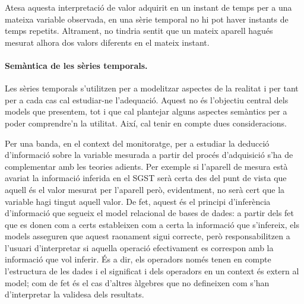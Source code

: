 Atesa aquesta interpretació de valor adquirit en un instant de
temps per a una mateixa variable observada, en una sèrie temporal no
hi pot haver instants de temps repetits. Altrament, no tindria sentit
que un mateix aparell hagués mesurat alhora dos valors diferents en el
mateix instant.
  






\paragraph{Semàntica de les sèries temporals.}
Les sèries temporals s'utilitzen per a modelitzar aspectes de la
realitat i per tant per a cada cas cal estudiar-ne l'adequació. Aquest
no és l'objectiu central dels models que presentem, tot i que cal
plantejar alguns aspectes semàntics per a poder comprendre'n la
utilitat. Així, cal tenir en compte dues consideracions.


Per una banda, en el context del monitoratge, per a estudiar la
deducció d'informació sobre la variable mesurada a partir del procés
d'adquisició s'ha de complementar amb les teories adients.  Per
exemple si l'aparell de mesura està avariat la informació inferida en
el \gls{SGST} serà certa des del punt de vista que aquell és el valor
mesurat per l'aparell però, evidentment, no serà cert que la variable
hagi tingut aquell valor. De fet, aquest és el principi d'inferència
d'informació que segueix el model relacional de bases de dades: a
partir dels fet que es donen com a certs estableixen com a certa la
informació que s'infereix, els models asseguren que aquest raonament
sigui correcte, però responsabilitzen a l'usuari d'interpretar si
aquella operació efectivament es correspon amb la informació que vol
inferir. És a dir, els operadors només tenen en compte l'estructura de
les dades i el significat i dels operadors en un context és extern al
model; com de fet és el cas d'altres àlgebres que no defineixen com
s'han d'interpretar la validesa dels resultats.

